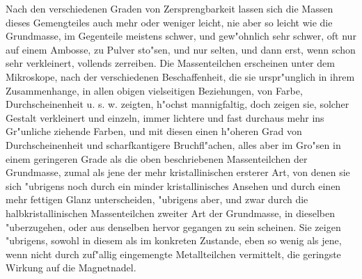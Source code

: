 \documentclass[a4paper, 11pt, oneside, german]{article}
\begin{document}
Nach den verschiedenen Graden von Zersprengbarkeit lassen sich die Massen dieses Gemengteiles auch mehr oder weniger leicht, nie aber so leicht wie die Grundmasse, im Gegenteile meistens schwer, und gew"ohnlich sehr schwer, oft nur auf einem Ambosse, zu Pulver sto"sen, und nur selten, und dann erst, wenn schon sehr verkleinert, vollends zerreiben. Die Massenteilchen erscheinen unter dem Mikroskope, nach der verschiedenen Beschaffenheit, die sie urspr"unglich in ihrem Zusammenhange, in allen obigen vielseitigen Beziehungen, von Farbe, Durchscheinenheit u. s. w. zeigten, h"ochst mannigfaltig, doch zeigen sie, solcher Gestalt verkleinert und einzeln, immer lichtere und fast durchaus mehr ins Gr"unliche ziehende Farben, und mit diesen einen h"oheren Grad von Durchscheinenheit und scharfkantigere Bruchfl"achen, alles aber im Gro"sen in einem geringeren Grade als die oben beschriebenen Massenteilchen der Grundmasse, zumal als jene der mehr kristallinischen ersterer Art, von denen sie sich "ubrigens noch durch ein minder kristallinisches Ansehen und durch einen mehr fettigen Glanz unterscheiden, "ubrigens aber, und zwar durch die halbkristallinischen Massenteilchen zweiter Art der Grundmasse, in dieselben "uberzugehen, oder aus denselben hervor gegangen zu sein scheinen. Sie zeigen "ubrigens, sowohl in diesem als im konkreten Zustande, eben so wenig als jene, wenn nicht durch zuf"allig eingemengte Metallteilchen vermittelt, die geringste Wirkung auf die Magnetnadel.
\end{document}
